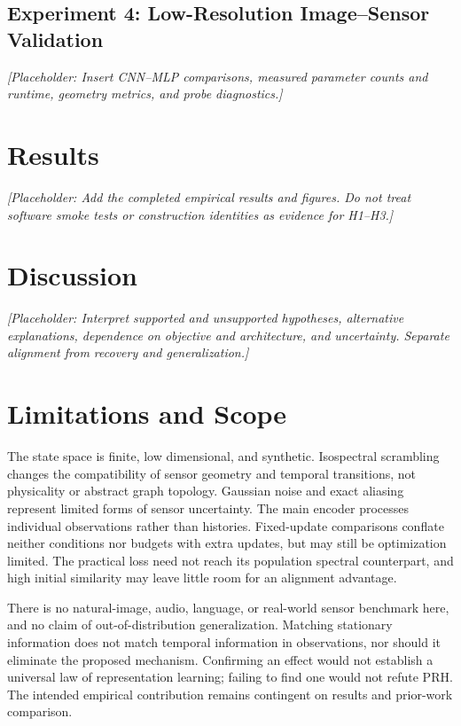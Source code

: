 \documentclass[11pt,a4paper]{article}
\newcommand{\placeholder}[1]{\par\medskip\noindent\textit{[Placeholder: #1]}\par\medskip}
\begin{document}
\subsection{Experiment 4: Low-Resolution Image--Sensor Validation}
\placeholder{Insert CNN--MLP comparisons, measured parameter counts and runtime, geometry metrics, and probe diagnostics.}

\section{Results}
\placeholder{Add the completed empirical results and figures. Do not treat software smoke tests or construction identities as evidence for H1--H3.}

\section{Discussion}
\placeholder{Interpret supported and unsupported hypotheses, alternative explanations, dependence on objective and architecture, and uncertainty. Separate alignment from recovery and generalization.}

\section{Limitations and Scope}
The state space is finite, low dimensional, and synthetic. Isospectral scrambling changes the compatibility of sensor geometry and temporal transitions, not physicality or abstract graph topology. Gaussian noise and exact aliasing represent limited forms of sensor uncertainty. The main encoder processes individual observations rather than histories. Fixed-update comparisons conflate neither conditions nor budgets with extra updates, but may still be optimization limited. The practical loss need not reach its population spectral counterpart, and high initial similarity may leave little room for an alignment advantage.

There is no natural-image, audio, language, or real-world sensor benchmark here, and no claim of out-of-distribution generalization. Matching stationary information does not match temporal information in observations, nor should it eliminate the proposed mechanism. Confirming an effect would not establish a universal law of representation learning; failing to find one would not refute PRH. The intended empirical contribution remains contingent on results and prior-work comparison.
\end{document}
